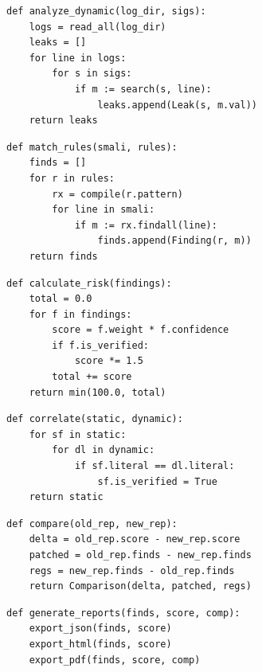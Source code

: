 \documentclass[conference]{
IEEEtran}
\begin{document}
\begin{lstlisting}[caption={Algorithm 2: Dynamic Logcat \& Network Extraction}, basicstyle=\scriptsize\ttfamily]
def analyze_dynamic(log_dir, sigs):
    logs = read_all(log_dir)
    leaks = []
    for line in logs:
        for s in sigs:
            if m := search(s, line):
                leaks.append(Leak(s, m.val))
    return leaks
\end{lstlisting}

\begin{lstlisting}[caption={Algorithm 3: Rule Engine Matcher}, basicstyle=\scriptsize\ttfamily]
def match_rules(smali, rules):
    finds = []
    for r in rules:
        rx = compile(r.pattern)
        for line in smali:
            if m := rx.findall(line):
                finds.append(Finding(r, m))
    return finds
\end{lstlisting}

\begin{lstlisting}[caption={Algorithm 4: Quantitative Scoring}, basicstyle=\scriptsize\ttfamily]
def calculate_risk(findings):
    total = 0.0
    for f in findings:
        score = f.weight * f.confidence
        if f.is_verified:
            score *= 1.5
        total += score
    return min(100.0, total)
\end{lstlisting}

\begin{lstlisting}[caption={Algorithm 5: Correlation Logic Engine}, basicstyle=\scriptsize\ttfamily]
def correlate(static, dynamic):
    for sf in static:
        for dl in dynamic:
            if sf.literal == dl.literal:
                sf.is_verified = True
    return static
\end{lstlisting}

\begin{lstlisting}[caption={Algorithm 6: Build Comparison Engine}, basicstyle=\scriptsize\ttfamily]
def compare(old_rep, new_rep):
    delta = old_rep.score - new_rep.score
    patched = old_rep.finds - new_rep.finds
    regs = new_rep.finds - old_rep.finds
    return Comparison(delta, patched, regs)
\end{lstlisting}

\begin{lstlisting}[caption={Algorithm 7: Report Compilers}, basicstyle=\scriptsize\ttfamily]
def generate_reports(finds, score, comp):
    export_json(finds, score)
    export_html(finds, score)
    export_pdf(finds, score, comp)
\end{lstlisting}
\end{document}
